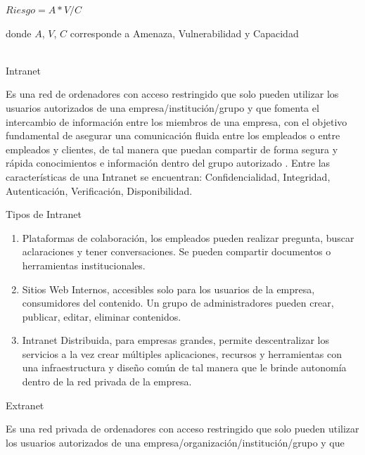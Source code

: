 \documentclass[a4paper,12pt]{article}
\begin{document}
\begin{center}
$Riesgo =A*V/C$ \\
\end{center}
donde $A$, $V$, $C$ corresponde a Amenaza, Vulnerabilidad y Capacidad \\
\\
\begin{bf}
Intranet\\ 
\end{bf}
Es una red de ordenadores con acceso restringido que solo pueden utilizar los 
usuarios autorizados de una empresa/institución/grupo y que fomenta el intercambio
de información entre los miembros de una empresa, con el objetivo fundamental de 
asegurar una comunicación fluida entre los empleados o entre empleados y clientes, 
de tal manera que puedan compartir de forma segura y rápida conocimientos e 
información dentro del grupo autorizado \cite{Cabello2014}.
Entre las características de una Intranet se encuentran: Confidencialidad, 
Integridad, Autenticación, Verificación, Disponibilidad.\\
\newline
\begin{bf}
Tipos de Intranet\\
\end{bf}
\begin{enumerate} 
\item Plataformas de colaboración, los empleados pueden realizar pregunta, buscar 
aclaraciones y tener conversaciones. Se pueden compartir documentos o herramientas 
institucionales.\\
\item Sitios Web Internos, accesibles solo para los usuarios de la empresa, consumidores
del contenido. Un grupo de administradores pueden crear, publicar, editar, 
eliminar contenidos.\\ 
\item Intranet Distribuida, para empresas grandes, permite descentralizar los servicios 
a la vez crear múltiples aplicaciones, recursos y herramientas con una 
infraestructura y diseño común de tal manera que le brinde autonomía dentro de la 
red privada de la empresa.\\
\end{enumerate}
\begin{bf}
Extranet\\
\end{bf}
Es una red privada de ordenadores con acceso restringido que solo pueden utilizar 
los usuarios autorizados de una empresa/organización/institución/grupo y que 
\end{document}

